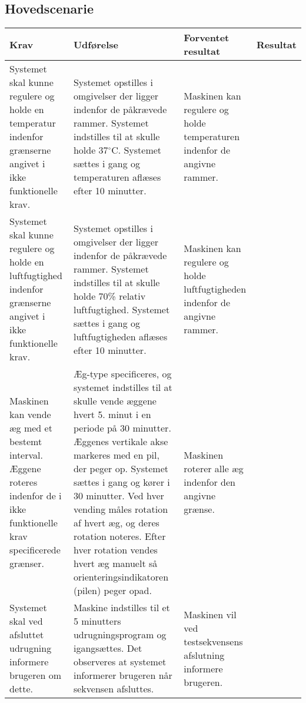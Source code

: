  
 \subsection{Hovedscenarie}
\begin{center}

	\begin{longtable}{| p{3cm} | p{3cm} | p{3cm} | p{3cm} |}
		\hline
		Krav & Udførelse & Forventet resultat & Resultat \\ \hline
		
		
		Systemet skal kunne regulere og holde en temperatur indenfor grænserne angivet i ikke funktionelle krav.
		&Systemet opstilles i omgivelser der ligger indenfor de påkrævede rammer. Systemet indstilles til at skulle holde 37$^\circ$C. Systemet sættes i gang og temperaturen aflæses efter 10 minutter. 
		&Maskinen kan regulere og holde temperaturen indenfor de angivne rammer. 
		& \\ \hline
		
		Systemet skal kunne regulere og holde en luftfugtighed indenfor grænserne angivet i ikke funktionelle krav.
		&Systemet opstilles i omgivelser der ligger indenfor de påkrævede rammer. Systemet indstilles til at skulle holde 70\% relativ luftfugtighed. Systemet sættes i gang og luftfugtigheden aflæses efter 10 minutter.
		&Maskinen kan regulere og holde luftfugtigheden indenfor de angivne rammer.
		& \\ \hline
		
		Maskinen kan vende æg med et bestemt interval. Æggene roteres indenfor de i ikke funktionelle krav specificerede grænser.
		&Æg-type specificeres, og systemet indstilles til at skulle vende æggene hvert 5. minut i en periode på 30 minutter. Æggenes vertikale akse markeres med en pil, der peger op. Systemet sættes i gang og kører i 30 minutter. Ved hver vending måles rotation af hvert æg, og deres rotation noteres. Efter hver rotation vendes hvert æg manuelt så orienteringsindikatoren (pilen) peger opad. 
		&Maskinen roterer alle æg indenfor den angivne grænse.
		& \\ \hline		
		
		Systemet skal ved afsluttet udrugning informere brugeren om dette.
		&Maskine indstilles til et 5 minutters udrugningsprogram og igangsættes. Det observeres at systemet informerer brugeren når sekvensen afsluttes.
		&Maskinen vil ved testsekvensens afslutning informere brugeren.
		& \\ \hline

		
		
	\end{longtable}
\end{center}
